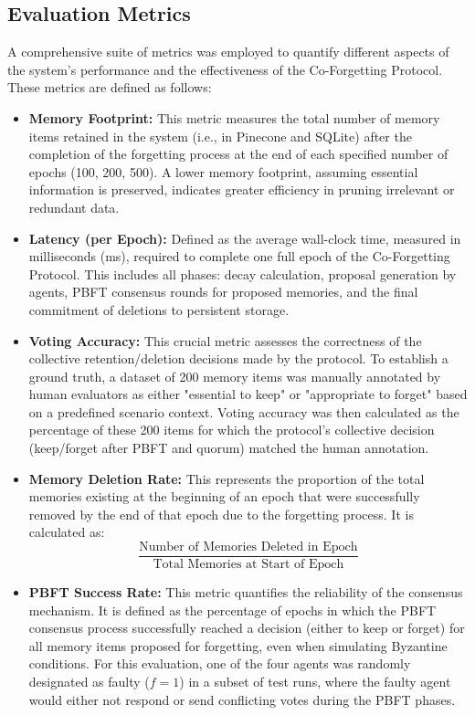 \documentclass[conference]{IEEEtran}
\begin{document}
\subsection{Evaluation Metrics}

A comprehensive suite of metrics was employed to quantify different aspects of the system’s performance and the effectiveness of the Co-Forgetting Protocol. These metrics are defined as follows:

\begin{itemize}
    \item \textbf{Memory Footprint:} This metric measures the total number of memory items retained in the system (i.e., in Pinecone and SQLite) after the completion of the forgetting process at the end of each specified number of epochs (100, 200, 500). A lower memory footprint, assuming essential information is preserved, indicates greater efficiency in pruning irrelevant or redundant data.
    \item \textbf{Latency (per Epoch):} Defined as the average wall-clock time, measured in milliseconds (ms), required to complete one full epoch of the Co-Forgetting Protocol. This includes all phases: decay calculation, proposal generation by agents, PBFT consensus rounds for proposed memories, and the final commitment of deletions to persistent storage.
    \item \textbf{Voting Accuracy:} This crucial metric assesses the correctness of the collective retention/deletion decisions made by the protocol. To establish a ground truth, a dataset of 200 memory items was manually annotated by human evaluators as either "essential to keep" or "appropriate to forget" based on a predefined scenario context. Voting accuracy was then calculated as the percentage of these 200 items for which the protocol’s collective decision (keep/forget after PBFT and quorum) matched the human annotation.
    \item \textbf{Memory Deletion Rate:} This represents the proportion of the total memories existing at the beginning of an epoch that were successfully removed by the end of that epoch due to the forgetting process. It is calculated as: 
\[
\frac{\text{Number of Memories Deleted in Epoch}}{\text{Total Memories at Start of Epoch}}
\]
    \item \textbf{PBFT Success Rate:} This metric quantifies the reliability of the consensus mechanism. It is defined as the percentage of epochs in which the PBFT consensus process successfully reached a decision (either to keep or forget) for all memory items proposed for forgetting, even when simulating Byzantine conditions. For this evaluation, one of the four agents was randomly designated as faulty ($f = 1$) in a subset of test runs, where the faulty agent would either not respond or send conflicting votes during the PBFT phases.

\end{itemize}
\end{document}
